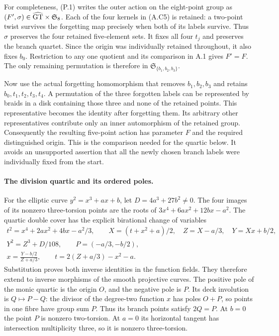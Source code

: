 For completeness, (P.1) writes the outer action on the eight-point
group as $(F',\sigma)\in\widehat{\mathrm{GT}}\times\mathfrak S_8$. Each of the four
kernels in (A.C5) is retained: a two-point twist survives the
forgetting map precisely when both of its labels survive. Thus
$\sigma$ preserves the four retained five-element sets. It fixes
all four $t_j$ and preserves the branch quartet. Since the origin
was individually retained throughout, it also fixes $b_0$.
Restriction to any one quotient and its comparison in A.1 gives
$F'=F$. The only remaining permutation is therefore in
$\mathfrak S_{\{b_1,b_2,b_3\}}$.

Now use the actual forgetting homomorphism that removes
$b_1,b_2,b_3$ and retains $b_0,t_1,t_2,t_3,t_4$. A permutation of
the three forgotten labels can be represented by braids in a disk
containing those three and none of the retained points. This
representative becomes the identity after forgetting them. Its
arbitrary other representatives contribute only an inner
automorphism of the retained group. Consequently the resulting
five-point action has parameter $F$ and the required distinguished
origin. This is the comparison needed for the quartic below. It
avoids an unsupported assertion that all the newly chosen branch
labels were individually fixed from the start.

\paragraph{The division quartic and its ordered poles.}
For the elliptic curve $y^2=x^3+ax+b$, let $D=4a^3+27b^2\ne0$.
The four images of its nonzero three-torsion points are the roots
of $3x^4+6ax^2+12bx-a^2$. The quartic double cover has the explicit
birational change of variables
\[
\begin{gathered}
 t^2=x^4+2ax^2+4bx-a^2/3,\qquad
 X=(t+x^2+a)/2,\quad Z=X-a/3,\quad Y=Xx+b/2,\\
 Y^2=Z^3+D/108,\qquad P=(-a/3,-b/2),\\
 x=\frac{Y-b/2}{Z+a/3},\qquad t=2(Z+a/3)-x^2-a.
\end{gathered}
\tag{A.C6}
\]
Substitution proves both inverse identities in the function fields.
They therefore extend to inverse morphisms of the smooth projective
curves. The positive pole of the monic quartic is the origin $O$,
and the negative pole is $P$. Its deck involution is $Q\mapsto P-Q$:
the divisor of the degree-two function $x$ has poles $O+P$, so
points in one fibre have group sum $P$. Thus its branch points
satisfy $2Q=P$. At $b=0$ the point $P$ is nonzero two-torsion.
At $a=0$ its horizontal tangent has intersection multiplicity three,
so it is nonzero three-torsion.


